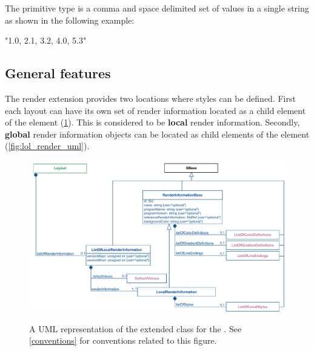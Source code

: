 The \doubleArray primitive type is a comma and space delimited set of  values in a single string as shown in the following example:

\begin{center}
"1.0, 2.1, 3.2, 4.0, 5.3"
\end{center}

%


\subsection{General features}
\label{features}
The render extension provides two locations where styles can be defined. First 
each layout can have its own set of render information located as a child element
of the \Layout element (\ref{fig:Render_uml}).  This is considered to be \textbf{local} render information.
Secondly, \textbf{global} render information objects can be located as child elements of the \ListOfLayouts element (\ref{fig:lol_render_uml}). 

\begin{figure}[ht!]
  \centering
  \includegraphics[width=\textwidth]{images/render-layout-uml}\\
  \caption{A UML representation of the extended \Layout class for the \RenderPackage. See \ref{conventions} for conventions related to this figure.}
  \label{fig:Render_uml}
\end{figure}

